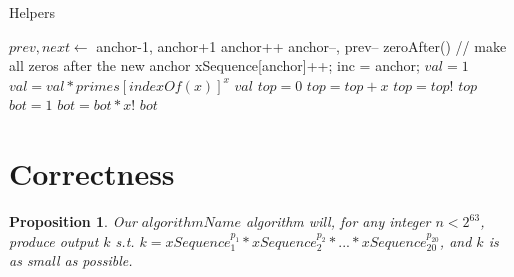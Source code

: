 \documentclass[12pt]{article}
\newtheorem{proposition}[theorem]{Proposition}
\begin{document}
\begin{algorithm}[H]
\caption{Helpers}
\begin{algorithmic}
        \State $prev, next \gets$ anchor-1, anchor+1
            \State anchor++
        \Else
                \State anchor--, prev--
            \EndWhile
        \EndIf
        \State zeroAfter() // make all zeros after the new anchor
        \State xSequence[anchor]++;
        \State inc = anchor;
    \EndProcedure
        \State $val = 1$
                \State $val = val \ast primes[indexOf(x)]^x$
        \EndFor
        \State \Return $val$
    \EndProcedure
        \State $top = 0$
            \State $top = top + x$
        \EndFor
        \State $top = top!$
        \State \Return $top$
    \EndProcedure
            \State $bot = 1$
                    \State $bot = bot \ast x!$
            \EndIf
        \EndFor
        \State \Return $bot$
    \EndProcedure
\end{algorithmic}
\end{algorithm}


\section{Correctness}

\begin{proposition}
Our $algorithmName$ algorithm will, for any integer $n < 2^{63}$, produce output $k$ s.t. $k = xSequence_1^{p_1} \ast xSequence_2^{p_2} \ast ... \ast xSequence_{20}^{p_{20}}$, and $k$ is as small as possible.
\end{proposition}
\end{document}
